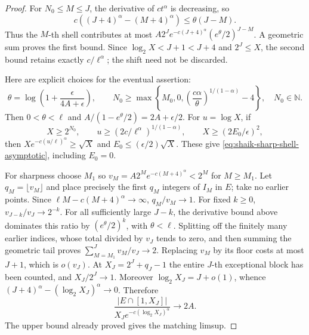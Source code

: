 \documentclass[11pt]{article}
\theoremstyle{remark}\newtheorem{remark}[proposition]{Remark}
\newcommand{\NN}{\mathbb N}
\begin{document}
\begin{proof}
For \(N_0\le M\le J\), the derivative of \(ct^\alpha\) is decreasing,
so
\[
 c((J+4)^\alpha-(M+4)^\alpha)\le\theta(J-M).
\]
Thus the \(M\)-th shell contributes at most
\(A2^Je^{-c(J+4)^\alpha}(e^\theta/2)^{J-M}\).
A geometric sum proves the first bound. Since
\(\log_2X<J+1<J+4\) and \(2^J\le X\), the second bound retains
exactly \(c/\ell^\alpha\); the shift need not be discarded.

Here are explicit choices for the eventual assertion:
\[
 \theta=\log\left(1+\frac{\epsilon}{4A+\epsilon}\right),\qquad
 N_0\ge\max\left\{M_0,0,
       \left(\frac{c\alpha}{\theta}\right)^{1/(1-\alpha)}-4\right\},
 \quad N_0\in\NN .
\]
Then \(0<\theta<\ell\) and
\(A/(1-e^\theta/2)=2A+\epsilon/2\).
For \(u=\log X\), if
\[
 X\ge2^{N_0},\qquad
 u\ge(2c/\ell^\alpha)^{1/(1-\alpha)},\qquad
 X\ge(2E_0/\epsilon)^2,
\]
then \(X e^{-c(u/\ell)^\alpha}\ge\sqrt X\) and
\(E_0\le(\epsilon/2)\sqrt X\).
These give \eqref{eq:shaik-sharp-shell-asymptotic}, including \(E_0=0\).

For sharpness choose \(M_1\) so
\(v_M=A2^M e^{-c(M+4)^\alpha}<2^M\) for \(M\ge M_1\).
Let \(q_M=\lfloor v_M\rfloor\) and place precisely the first \(q_M\)
integers of \(I_M\) in \(E\); take no earlier points.
Since \(\ell M-c(M+4)^\alpha\to\infty\), \(q_M/v_M\to1\).
For fixed \(k\ge0\), \(v_{J-k}/v_J\to2^{-k}\).
For all sufficiently large \(J-k\), the derivative bound above
dominates this ratio by \((e^\theta/2)^k\), with \(\theta<\ell\).
Splitting off the finitely many earlier indices, whose total divided
by \(v_J\) tends to zero, and then summing the geometric tail proves
\(\sum_{M=M_1}^Jv_M/v_J\to2\).
Replacing \(v_M\) by its floor costs at most \(J+1\), which is
\(o(v_J)\). At \(X_J=2^J+q_J-1\) the entire \(J\)-th exceptional
block has been counted, and \(X_J/2^J\to1\).
Moreover \(\log_2X_J=J+o(1)\), whence
\((J+4)^\alpha-(\log_2X_J)^\alpha\to0\).
Therefore
\[
 \frac{|E\cap[1,X_J]|}
 {X_Je^{-c(\log_2X_J)^\alpha}}\longrightarrow2A .
\]
The upper bound already proved gives the matching limsup.
\end{proof}
\end{document}
